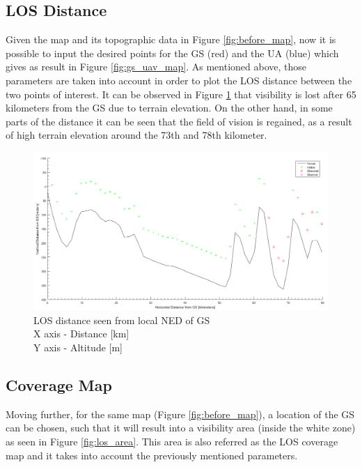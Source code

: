 \subsection{LOS Distance}
Given the map and its topographic data in Figure \ref{fig:before_map}, now it is possible to input the desired points for the GS (red) and the UA (blue) which gives as result in Figure \ref{fig:gs_uav_map}. As mentioned above, those parameters are taken into account in order to plot the LOS distance between the two points of interest. It can be observed in Figure \ref{fig:los_2p} that visibility is lost after 65 kilometers from the GS due to terrain elevation. On the other hand, in some parts of the distance it can be seen that the field of vision is regained, as a result of high terrain elevation around the 73th and 78th kilometer.

\begin{figure}[h]
	\centering
	\includegraphics[scale=0.40]{figures/los_2p.png}
	\caption{LOS distance seen from local NED of GS \\ X axis - Distance [km] \\ Y axis - Altitude [m]}
   	\label{fig:los_2p}
\end{figure}

\subsection{Coverage Map}
Moving further, for the same map (Figure \ref{fig:before_map}), a location of the GS can be chosen, such that it will result into a visibility area (inside the white zone) as seen in Figure \ref{fig:los_area}. This area is also referred as the LOS coverage map and it takes into account the previously mentioned parameters.

